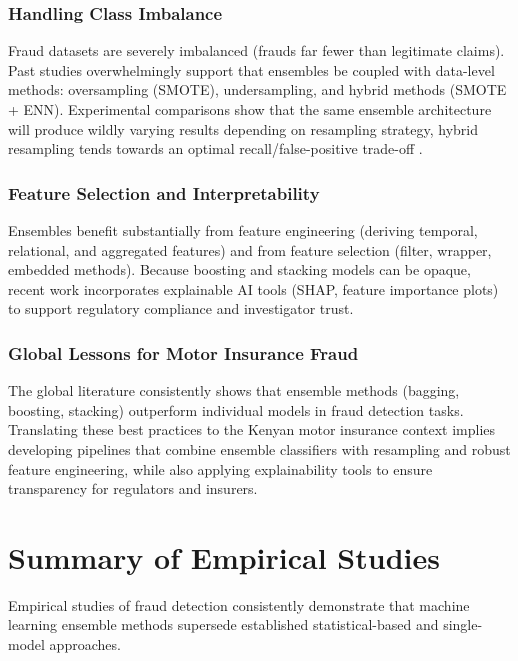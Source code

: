 \documentclass[12pt,a4paper,oneside]{report}
\numberwithin{equation}{chapter}
\begin{document}
\subsubsection{Handling Class Imbalance}

Fraud datasets are severely imbalanced (frauds far fewer than legitimate claims). Past studies
overwhelmingly support that ensembles be coupled with data-level methods: oversampling (SMOTE),
undersampling, and hybrid methods (SMOTE + ENN). Experimental comparisons show that the same
ensemble architecture will produce wildly varying results depending on resampling strategy, \cite{Eteng2025,Khalid2024} hybrid
resampling tends towards an optimal recall/false-positive trade-off .

\subsubsection{Feature Selection and Interpretability}
\label{sec:interpretability-gap}

Ensembles benefit substantially from feature engineering (deriving temporal, relational, and
aggregated features) and from feature selection (filter, wrapper, embedded methods). Because
boosting and stacking models can be opaque, recent work \cite{Ming2024,Scrivano2024} incorporates
explainable AI tools (SHAP, feature importance plots) to support regulatory compliance and
investigator trust.

\subsubsection{Global Lessons for Motor Insurance Fraud}

The global literature consistently shows that ensemble methods (bagging, boosting, stacking)
outperform individual models in fraud detection tasks. Translating these best practices to the
Kenyan motor insurance context implies developing pipelines that combine ensemble classifiers
with resampling and robust feature engineering, while also applying explainability tools
\cite{Wambu2025} to ensure transparency for regulators and insurers.

\section{Summary of Empirical Studies}

Empirical studies of fraud detection consistently demonstrate that machine learning ensemble
methods supersede established statistical-based and single-model approaches.
\end{document}
